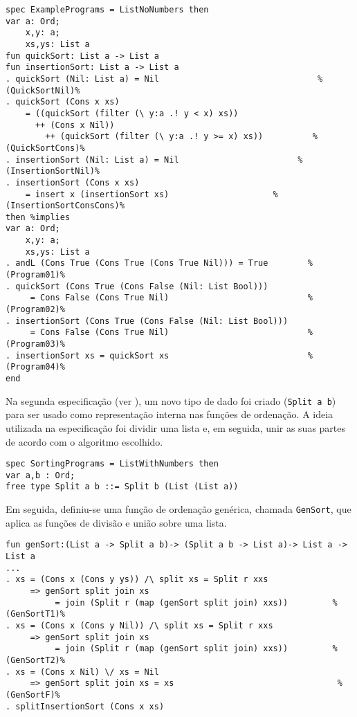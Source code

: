 \begin{Verbatim}
spec ExamplePrograms = ListNoNumbers then
var a: Ord;
    x,y: a;
    xs,ys: List a
fun quickSort: List a -> List a
fun insertionSort: List a -> List a
. quickSort (Nil: List a) = Nil                                %(QuickSortNil)%
. quickSort (Cons x xs)                                   
    = ((quickSort (filter (\ y:a .! y < x) xs))           
      ++ (Cons x Nil))                                    
        ++ (quickSort (filter (\ y:a .! y >= x) xs))          %(QuickSortCons)%
. insertionSort (Nil: List a) = Nil                        %(InsertionSortNil)%
. insertionSort (Cons x xs)                               
    = insert x (insertionSort xs)                     %(InsertionSortConsCons)%
then %implies
var a: Ord;
    x,y: a;
    xs,ys: List a
. andL (Cons True (Cons True (Cons True Nil))) = True        %(Program01)%
. quickSort (Cons True (Cons False (Nil: List Bool)))       
     = Cons False (Cons True Nil)                            %(Program02)%
. insertionSort (Cons True (Cons False (Nil: List Bool)))   
     = Cons False (Cons True Nil)                            %(Program03)%
. insertionSort xs = quickSort xs                            %(Program04)%
end
\end{Verbatim}

Na segunda especificação (ver ), um novo tipo de dado foi criado (\Verb.Split a b.) para ser usado como representação interna nas funções de ordenação.
A ideia utilizada na especificação foi dividir uma lista e, em seguida, unir as suas partes de acordo com o algoritmo escolhido.

\begin{Verbatim}
spec SortingPrograms = ListWithNumbers then
var a,b : Ord;
free type Split a b ::= Split b (List (List a))
\end{Verbatim}

Em seguida, definiu-se uma função de ordenação genérica, chamada \Verb.GenSort., que aplica as funções de divisão e união sobre uma lista.

\begin{Verbatim}
fun genSort:(List a -> Split a b)-> (Split a b -> List a)-> List a -> List a
...
. xs = (Cons x (Cons y ys)) /\ split xs = Split r xxs 
     => genSort split join xs
          = join (Split r (map (genSort split join) xxs))         %(GenSortT1)%
. xs = (Cons x (Cons y Nil)) /\ split xs = Split r xxs 
     => genSort split join xs 
          = join (Split r (map (genSort split join) xxs))         %(GenSortT2)%
. xs = (Cons x Nil) \/ xs = Nil
     => genSort split join xs = xs                                 %(GenSortF)%
. splitInsertionSort (Cons x xs) 
\end{Verbatim}

